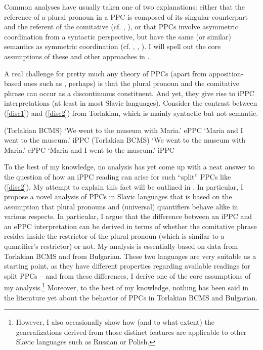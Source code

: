 \documentclass[output=paper,colorlinks,citecolor=brown]{langscibook}
\begin{document}
\noindent Common analyses have usually taken one of two explanations: either that the reference of a plural pronoun in a PPC is composed of its singular counterpart and the referent of the comitative (cf. \cite{VassilievaLarson2001}, \cite{VassilievaLarson2005}), or that PPCs involve asymmetric coordination from a syntactic perspective, but have the same (or similar) semantics as symmetric coordination (cf. \cite{Dyla1988}, \cite{McNally1993}, \cite{FeldmanDyla2008}). I will spell out the core assumptions of these and other approaches in . 


A real challenge for pretty much any theory of PPCs (apart from apposition-based ones such as \cite{Cable2017}, perhaps) is that the plural pronoun and the comitative phrase can occur as a discontinuous constituent. And yet, they give rise to iPPC interpretations (at least in most Slavic languages). Consider the contrast between (\ref{disc1}) and (\ref{disc2}) from Torlakian, which is mainly syntactic but not semantic. 

\hfill (Torlakian BCMS) \label{disc1}
\ea `We went to the museum with Maria.' \hfill ePPC
\ex `Maria and I went to the museum.' \hfill iPPC 
\z \z
{} \hfill (Torlakian BCMS)\label{disc2}
\ea `We went to the museum with Maria.' \hfill ePPC 
\ex `Maria and I went to the museum.' \hfill iPPC
\z \z

\noindent To the best of my knowledge, no analysis has yet come up with a neat answer to the question of how an iPPC reading can arise for such ``split'' PPCs like (\ref{disc2}). My attempt to explain this fact will be outlined in . In particular, I propose a novel analysis of PPCs in Slavic languages that is based on the assumption that plural pronouns and (universal) quantifiers behave alike in various respects. In particular, I argue that the difference between an iPPC  and an ePPC interpretation can be derived in terms of whether the comitative phrase resides inside the restrictor of the plural pronoun (which is similar to a quantifier's restrictor) or not. My analysis is essentially based on data from Torlakian BCMS and from Bulgarian. These two languages are very suitable as a starting point, as they have different properties regarding available readings for split PPCs -- and from these differences, I derive one of the core assumptions of my analysis.\footnote{However, I also occasionally show how (and to what extent) the generalizations derived from those distinct features are applicable to other Slavic languages such as Russian or Polish.} Moreover, to the best of my knowledge, nothing has been said in the literature yet about the behavior of PPCs in Torlakian BCMS and Bulgarian. 
\end{document}
